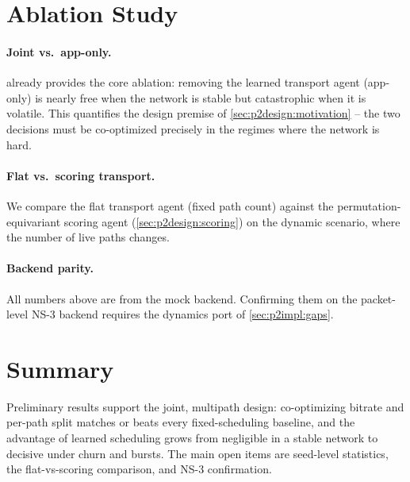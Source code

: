 

\section{Ablation Study}
\label{sec:p2eval:ablation}

\paragraph{Joint vs.\ app-only.}  already provides the core ablation: removing the
learned transport agent (app-only) is nearly free when the network is stable but catastrophic when it is
volatile. This quantifies the design premise of \cref{sec:p2design:motivation} -- the two decisions must
be co-optimized precisely in the regimes where the network is hard.

\paragraph{Flat vs.\ scoring transport.} We compare the flat transport agent (fixed path count) against
the permutation-equivariant scoring agent (\cref{sec:p2design:scoring}) on the dynamic scenario, where the
number of live paths changes.

\paragraph{Backend parity.} All numbers above are from the mock backend. Confirming them on the
packet-level NS-3 backend requires the dynamics port of \cref{sec:p2impl:gaps}.

\section{Summary}
\label{sec:p2eval:summary}
Preliminary results support the joint, multipath design: co-optimizing bitrate and per-path split matches
or beats every fixed-scheduling baseline, and the advantage of learned scheduling grows from negligible
in a stable network to decisive under churn and bursts. The main open items are seed-level statistics,
the flat-vs-scoring comparison, and NS-3 confirmation.
